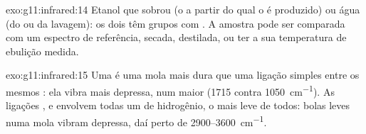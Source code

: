 \begin{solution}{exo:g11:infrared:14}
Etanol que sobrou (o  a partir do qual o  é produzido) ou
água (do  ou da lavagem): os dois têm grupos  com . A amostra pode ser comparada com um espectro de referência,
secada, destilada, ou ter a sua temperatura de ebulição medida.
\end{solution}

\begin{solution}{exo:g11:infrared:15}
Uma  é uma mola mais dura que uma ligação simples entre os
mesmos : ela vibra mais depressa, num  maior (1715
contra \qty{1050}{cm^{-1}}). As ligações ,  e 
envolvem todas um  de hidrogênio, o mais leve de todos: bolas leves
numa mola vibram depressa, daí  perto de
2900--\qty{3600}{cm^{-1}}.
\end{solution}

